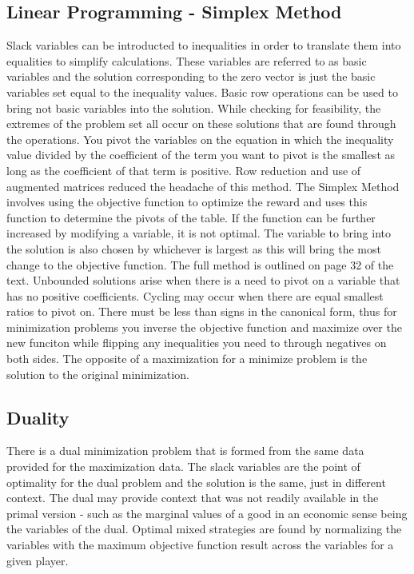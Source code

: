 \documentclass[12pt]{article}
\begin{document}
\subsection{Linear Programming - Simplex Method}
Slack variables can be introducted to inequalities in order to translate them into equalities to simplify calculations. These variables are referred to as basic variables and the solution 
corresponding to the zero vector is just the basic variables set equal to the inequality values. Basic row operations can be used to bring not basic variables into the solution. 
While checking for feasibility, the extremes of the problem set all occur on these solutions that are found through the operations. You pivot the variables on the equation in which the 
inequality value divided by the coefficient of the term you want to pivot is the smallest as long as the coefficient of that term is positive. Row reduction and use of augmented matrices 
reduced the headache of this method. The Simplex Method involves using the objective function to optimize the reward and uses this function to determine the pivots of the table. If the 
function can be further increased by modifying a variable, it is not optimal. The variable to bring into the solution is also chosen by whichever is largest as this will bring the most change 
to the objective function. The full method is outlined on page 32 of the text. Unbounded solutions arise when there is a need to pivot on a variable that has no positive coefficients. Cycling 
may occur when there are equal smallest ratios to pivot on. There must be less than signs in the canonical form, thus for minimization problems you inverse the objective function and 
maximize over the new funciton while flipping any inequalities you need to through negatives on both sides. The opposite of a maximization for a minimize problem is the solution to the 
original minimization. 
\subsection{Duality}
There is a dual minimization problem that is formed from the same data provided for the maximization data. The slack variables are the point of optimality for the dual problem and the solution 
is the same, just in different context. The dual may provide context that was not readily available in the primal version - such as the marginal values of a good in an economic sense being the 
variables of the dual. Optimal mixed strategies are found by normalizing the variables with the maximum objective function result across the variables for a given player. 
\end{document}
